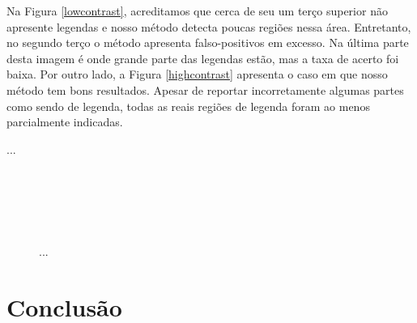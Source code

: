 \documentclass[12pt]{article}
\begin{document}
Na Figura \ref{lowcontrast}, acreditamos que cerca de seu um
terço superior não apresente legendas e nosso método detecta poucas
regiões nessa área. Entretanto, no segundo terço o método apresenta
falso-positivos em excesso. Na última parte desta imagem é onde grande
parte das legendas estão, mas a taxa de acerto foi baixa. Por outro
lado, a Figura \ref{highcontrast} apresenta o caso em que nosso método
tem bons resultados. Apesar de reportar incorretamente algumas partes
como sendo de legenda, todas as reais regiões de legenda
foram ao menos parcialmente indicadas.

...

\begin{figure}[h!]
  \centering
  \quad
  \\
  \quad
  \\
  \quad
  \\
  \quad
  \\
  \caption{...}
\end{figure}




\section{Conclusão}




\end{document}
